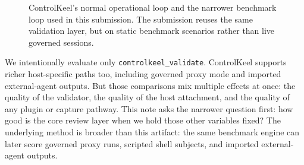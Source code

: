 \documentclass[10pt]{article}
\begin{document}
\begin{figure}[t]
\centering
{}
\caption{ControlKeel's normal operational loop and the narrower benchmark loop used in this submission. The submission reuses the same validation layer, but on static benchmark scenarios rather than live governed sessions.}
\label{fig:workflow}
\end{figure}

We intentionally evaluate only \texttt{controlkeel\_validate}. ControlKeel supports richer host-specific paths too, including governed proxy mode and imported external-agent outputs. But those comparisons mix multiple effects at once: the quality of the validator, the quality of the host attachment, and the quality of any plugin or capture pathway. This note asks the narrower question first: how good is the core review layer when we hold those other variables fixed? The underlying method is broader than this artifact: the same benchmark engine can later score governed proxy runs, scripted shell subjects, and imported external-agent outputs.
\end{document}
